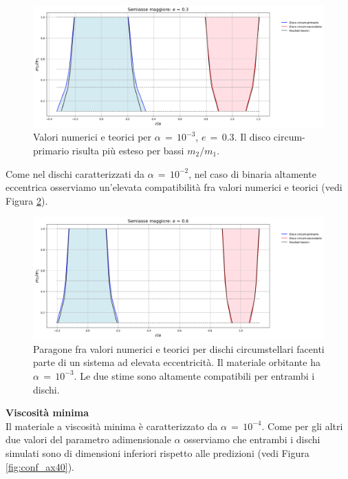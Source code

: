 \begin{figure}[H]
  \centering
  \includegraphics[width=\textwidth]{Immagini/Confronto/confax_A3_e3.png}
  \caption{Valori numerici e teorici per $\alpha\,=\,10^{-3}$, $e\,=\,0.3$. Il disco circum-primario risulta più esteso per bassi $m_2/m_1$.}
  \label{fig:conf_ax33}
\end{figure}

Come nel dischi caratterizzati da $\alpha\,=\,10^{-2}$, nel caso di binaria altamente eccentrica osserviamo un'elevata compatibilità fra valori numerici e teorici (vedi Figura \ref{fig:conf_ax36}).

\begin{figure}[H]
  \centering
  \includegraphics[width=\textwidth]{Immagini/Confronto/confax_A3_e6.png}
  \caption{Paragone fra valori numerici e teorici per dischi circumstellari facenti parte di un sistema ad elevata eccentricità. Il materiale orbitante ha $\alpha\,=\,10^{-3}$. Le due stime sono altamente compatibili per entrambi i dischi. }
  \label{fig:conf_ax36}
\end{figure}

\textbf{Viscosità minima}\\

Il materiale a viscosità minima è caratterizzato da $\alpha\,=\,10^{-4}$.
Come per gli altri due valori del parametro adimensionale $\alpha$ osserviamo che entrambi i dischi simulati sono di dimensioni inferiori rispetto alle predizioni (vedi Figura \ref{fig:conf_ax40}).

